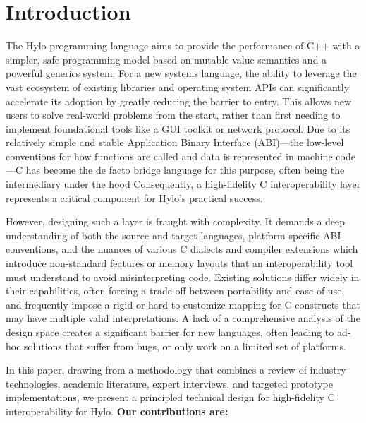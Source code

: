 \newpage
\section{Introduction}

The Hylo programming language aims to provide the performance of C++ with a simpler, safe programming model based on mutable value semantics and a powerful generics system. For a new systems language, the ability to leverage the vast ecosystem of existing libraries and operating system APIs can significantly accelerate its adoption by greatly reducing the barrier to entry. This allows new users to solve real-world problems from the start, rather than first needing to implement foundational tools like a GUI toolkit or network protocol. Due to its relatively simple and stable Application Binary Interface (ABI)—the low-level conventions for how functions are called and data is represented in machine code—C has become the de facto bridge language for this purpose, often being the intermediary under the hood  Consequently, a high-fidelity C interoperability layer represents a critical component for Hylo's practical success.

However, designing such a layer is fraught with complexity. It demands a deep understanding of both the source and target languages, platform-specific ABI conventions, and the nuances of various C dialects and compiler extensions which introduce non-standard features or memory layouts that an interoperability tool must understand to avoid misinterpreting code. Existing solutions differ widely in their capabilities, often forcing a trade-off between portability and ease-of-use, and frequently impose a rigid or hard-to-customize mapping for C constructs that may have multiple valid interpretations. A lack of a comprehensive analysis of the design space creates a significant barrier for new languages, often leading to ad-hoc solutions that suffer from bugs, or only work on a limited set of platforms.

In this paper, drawing from a methodology that combines a review of industry technologies, academic literature, expert interviews, and targeted prototype implementations, we present a principled technical design for high-fidelity C interoperability for Hylo. \textbf{Our contributions are:}

